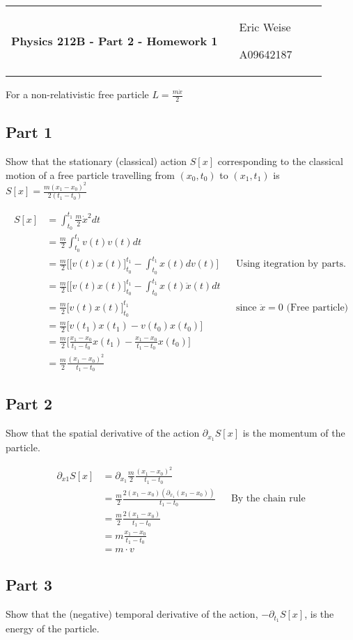 \documentclass{article}
\newcommand{\assignment}[2]{
    \newpage
    \begin{tabular}{p{0.65\linewidth}p{0.25\linewidth}}
        {\bf\LARGE Physics 212B - Part #1 - Homework #2 }
        &
        \parbox[b]{0.24\textwidth}{
            \hfill Eric Weise

            \hfill A09642187
            }
    \end{tabular}
    \vspace{12pt}
    \newline
}
\begin{document}
\assignment{2}{1}
For a non-relativistic free particle \( L = \frac{m\dot{x}}{2} \)
\subsection*{Part 1}
Show that the stationary (classical) action $S[x]$ corresponding to the
classical motion of a free particle travelling from $(x_0,t_0)$ to
$(x_1,t_1)$ is \( S[x]= \frac{m(x_1-x_0)^2}{2(t_1-t_0)}\)

\begin{align*}
    S[x]
    &= \int_{t_0}^{t_1} \frac{m}{2}\dot{x}^2 dt \\
    &= \frac{m}{2} \int_{t_0}^{t_1} v(t) v(t) dt \\
    &= \frac{m}{2} \Big[ \big[ v(t) x(t) \big]_{t_0}^{t_1} - \int_{t_0}^{t_1} x(t) dv(t) \Big]
        && \text{Using itegration by parts.} \\
    &= \frac{m}{2} \Big[ \big[ v(t) x(t) \big]_{t_0}^{t_1} - \int_{t_0}^{t_1} x(t) \ddot{x}(t) dt \\
    &= \frac{m}{2} \big[ v(t) x(t) \big]_{t_0}^{t_1}
        && \text{since $\ddot{x}=0$ (Free particle)} \\
    &= \frac{m}{2} \big[ v(t_1) x(t_1) - v(t_0) x(t_0) \big] \\
    &= \frac{m}{2} \big[ \frac{x_1 - x_0}{t_1 - t_0} x(t_1) - \frac{x_1 - x_0}{t_1 - t_0} x(t_0) \big] \\
    &= \frac{m}{2} \frac{(x_1 - x_0)^2}{t_1 - t_0}
\end{align*}

\subsection*{Part 2}
Show that the spatial derivative of the action \( \partial_{x_1} S[x] \) is the momentum of the particle.

\begin{align*}
    \partial_{x1} S[x]
    &= \partial_{x_1} \frac{m}{2} \frac{(x_1 - x_0)^2}{t_1 - t_0} \\
    &= \frac{m}{2} \frac{2(x_1 - x_0)(\partial_{x_1}(x_1 - x_0))}{t_1 - t_0}
        && \text{By the chain rule} \\
    &= \frac{m}{2} \frac{2(x_1 - x_0)}{t_1 - t_0} \\
    &= m \frac{x_1 - x_0}{t_1 - t_0} \\
    &= m \cdot v
\end{align*}

\subsection*{Part 3}
Show that the (negative) temporal derivative of the action, \( -\partial_{t_1} S[x] \), is the energy of the particle.
\end{document}
